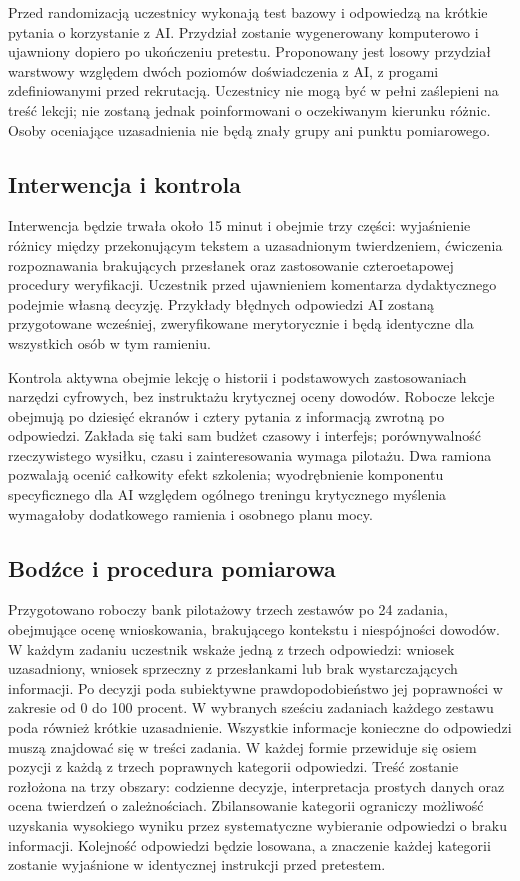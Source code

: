\documentclass[11pt,a4paper]{article}
\begin{document}
Przed randomizacją uczestnicy wykonają test bazowy i odpowiedzą na krótkie pytania o korzystanie z AI. Przydział zostanie wygenerowany komputerowo i ujawniony dopiero po ukończeniu pretestu. Proponowany jest losowy przydział warstwowy względem dwóch poziomów doświadczenia z AI, z progami zdefiniowanymi przed rekrutacją. Uczestnicy nie mogą być w pełni zaślepieni na treść lekcji; nie zostaną jednak poinformowani o oczekiwanym kierunku różnic. Osoby oceniające uzasadnienia nie będą znały grupy ani punktu pomiarowego.

\subsection{Interwencja i kontrola}
Interwencja będzie trwała około 15 minut i obejmie trzy części: wyjaśnienie różnicy między przekonującym tekstem a uzasadnionym twierdzeniem, ćwiczenia rozpoznawania brakujących przesłanek oraz zastosowanie czteroetapowej procedury weryfikacji. Uczestnik przed ujawnieniem komentarza dydaktycznego podejmie własną decyzję. Przykłady błędnych odpowiedzi AI zostaną przygotowane wcześniej, zweryfikowane merytorycznie i będą identyczne dla wszystkich osób w tym ramieniu.

Kontrola aktywna obejmie lekcję o historii i podstawowych zastosowaniach narzędzi cyfrowych, bez instruktażu krytycznej oceny dowodów. Robocze lekcje obejmują po dziesięć ekranów i cztery pytania z informacją zwrotną po odpowiedzi. Zakłada się taki sam budżet czasowy i interfejs; porównywalność rzeczywistego wysiłku, czasu i zainteresowania wymaga pilotażu. Dwa ramiona pozwalają ocenić całkowity efekt szkolenia; wyodrębnienie komponentu specyficznego dla AI względem ogólnego treningu krytycznego myślenia wymagałoby dodatkowego ramienia i osobnego planu mocy.

\subsection{Bodźce i procedura pomiarowa}
Przygotowano roboczy bank pilotażowy trzech zestawów po 24 zadania, obejmujące ocenę wnioskowania, brakującego kontekstu i niespójności dowodów. W każdym zadaniu uczestnik wskaże jedną z trzech odpowiedzi: wniosek uzasadniony, wniosek sprzeczny z przesłankami lub brak wystarczających informacji. Po decyzji poda subiektywne prawdopodobieństwo jej poprawności w zakresie od 0 do 100 procent. W wybranych sześciu zadaniach każdego zestawu poda również krótkie uzasadnienie. Wszystkie informacje konieczne do odpowiedzi muszą znajdować się w treści zadania. W każdej formie przewiduje się osiem pozycji z każdą z trzech poprawnych kategorii odpowiedzi. Treść zostanie rozłożona na trzy obszary: codzienne decyzje, interpretacja prostych danych oraz ocena twierdzeń o zależnościach. Zbilansowanie kategorii ograniczy możliwość uzyskania wysokiego wyniku przez systematyczne wybieranie odpowiedzi o braku informacji. Kolejność odpowiedzi będzie losowana, a znaczenie każdej kategorii zostanie wyjaśnione w identycznej instrukcji przed pretestem.
\end{document}
